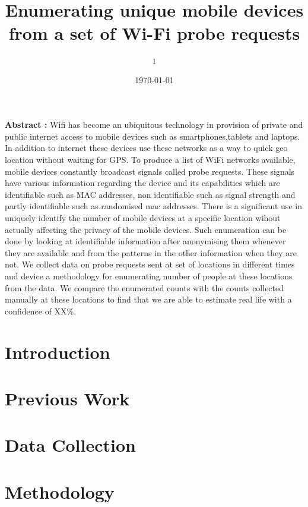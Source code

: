 \documentclass[11t, a4paper, twocolumn]{article}
\title{Enumerating unique mobile devices from a set of Wi-Fi probe requests}
\author{
	\authorstyle{
		Balamurugan Soundararaj\textsuperscript{1}, 
		James Cheshire\textsuperscript{1} and 
		Paul Longley\textsuperscript{1}}
	\newline\newline
	\textsuperscript{1}\institution{
		Department of Geography, 
		University College London, 
		United Kingdom}
}
\date{\today}
\begin{document}
	\maketitle

	\thispagestyle{firstpage}

	\textbf{Abstract : }
	Wifi has become an ubiquitous technology in provision of private and public 
	internet access to mobile devices such as smartphones,tablets and laptops.
	In addition to internet these devices use these networks as a way to quick 
	geo location without waiting for GPS.
	To produce a list of WiFi networks available, mobile devices constantly 
	broadcast signals called probe requests.
	These signals have various information regarding the device and its 
	capabilities which are identifiable such as MAC addresses, non identifiable 
	such as signal strength and partly identifiable such as randomised mac 
	addresses.
	There is a significant use in uniquely identify the number of mobile devices
	at a specific location wihout actually affecting the privacy of the mobile
	devices.
	Such enumeration can be done by looking at identifiable information after 
	anonymising them whenever they are available and from the patterns in the 
	other information when they are not.
	We collect data on probe requests sent at set of locations in 
	different times and device a methodology for enumerating number of people
	at these locations from the data.
	We compare the enumerated counts with the counts collected manually at
	these locations to find that we are able to estimate real life with a 
	confidence of XX\%.
	
	\section{Introduction}\label{intro}
		
	\section{Previous Work}\label{prev}
		\lipsum[1-2]
		\citep{vanhoef2016}
		\citep{matte2016}
		\citep{martin2017}
		\citep{vo2016}
		\citep{konto2017}
	\section{Data Collection}\label{data}
		\lipsum[1-2]
	\section{Methodology}\label{method}
		\lipsum[1]
\end{document}
